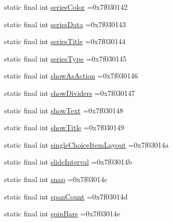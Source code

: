 \begin{DoxyCompactItemize}
\item 
static final int \mbox{\hyperlink{classcom_1_1example_1_1trainawearapplication_1_1_r_1_1attr_afd61c562031d13f64b319ab485a383a3}{series\+Color}} =0x7f030142
\item 
static final int \mbox{\hyperlink{classcom_1_1example_1_1trainawearapplication_1_1_r_1_1attr_a788cc2e11455a49624bb42633d8feddf}{series\+Data}} =0x7f030143
\item 
static final int \mbox{\hyperlink{classcom_1_1example_1_1trainawearapplication_1_1_r_1_1attr_abe5f353990d4f61057aeaa3fb61d1df8}{series\+Title}} =0x7f030144
\item 
static final int \mbox{\hyperlink{classcom_1_1example_1_1trainawearapplication_1_1_r_1_1attr_a3e7211dd9d382695a329922a7724e0f8}{series\+Type}} =0x7f030145
\item 
static final int \mbox{\hyperlink{classcom_1_1example_1_1trainawearapplication_1_1_r_1_1attr_a7b5e700a9ea1896e028b83d047cf03a5}{show\+As\+Action}} =0x7f030146
\item 
static final int \mbox{\hyperlink{classcom_1_1example_1_1trainawearapplication_1_1_r_1_1attr_a3e4000abd179e0d820539cb5828c1ab7}{show\+Dividers}} =0x7f030147
\item 
static final int \mbox{\hyperlink{classcom_1_1example_1_1trainawearapplication_1_1_r_1_1attr_a59d162a5b1a1a60fc12760ca66de6ef0}{show\+Text}} =0x7f030148
\item 
static final int \mbox{\hyperlink{classcom_1_1example_1_1trainawearapplication_1_1_r_1_1attr_ae6c7904633454657efef9f37a3ea8657}{show\+Title}} =0x7f030149
\item 
static final int \mbox{\hyperlink{classcom_1_1example_1_1trainawearapplication_1_1_r_1_1attr_a9c51ff4655365fca8feeaea6202ac5e2}{single\+Choice\+Item\+Layout}} =0x7f03014a
\item 
static final int \mbox{\hyperlink{classcom_1_1example_1_1trainawearapplication_1_1_r_1_1attr_afec03776e365a22289759fc596609843}{slide\+Interval}} =0x7f03014b
\item 
static final int \mbox{\hyperlink{classcom_1_1example_1_1trainawearapplication_1_1_r_1_1attr_ac3ef4c169c269dd4d331d004c58c674a}{snap}} =0x7f03014c
\item 
static final int \mbox{\hyperlink{classcom_1_1example_1_1trainawearapplication_1_1_r_1_1attr_a37e1a7fcc328c15e7c8d4e3fc54b26ed}{span\+Count}} =0x7f03014d
\item 
static final int \mbox{\hyperlink{classcom_1_1example_1_1trainawearapplication_1_1_r_1_1attr_a710f7dc20900af8ff2c839707ea010c8}{spin\+Bars}} =0x7f03014e

\end{DoxyCompactItemize}
